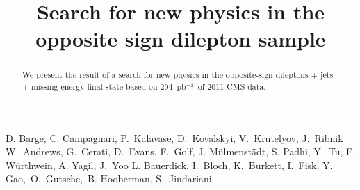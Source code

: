 \documentclass{cmspaper}
\newcommand{\lumi}{204~pb$^{-1}$}
\begin{document}
  

\begin{titlepage}
    \pagestyle {plain}

  \title {Search for new physics in the opposite sign dilepton sample}
\begin{Authlist}
D. Barge, C. Campagnari, P.~Kalavase, D.~Kovalskyi, V.~Krutelyov, J.~Ribnik
W.~Andrews, G.~Cerati, D.~Evans, F.~Golf, J. M\"ulmenst\"adt, S. Padhi, Y.~Tu, F. W\"urthwein, A. Yagil, J.~Yoo
L. Bauerdick, I.~Bloch, K.~Burkett, I.~Fisk, Y.~ Gao,~O.~Gutsche,~B. Hooberman, S.~Jindariani
\end{Authlist}
 

    \begin{abstract}
We present the result of a search for new physics in the opposite-sign 
dileptons $+$ jets $+$ missing energy final state based on \lumi\
of 2011 CMS data.  

  \end{abstract}

\end{titlepage}
\newpage


\tableofcontents
\newpage
\linenumbers
%









%

%
%

\clearpage

\clearpage
\appendixtitleon
\appendixtitletocon
\begin{appendices}
   

\end{appendices}
\end{document}
